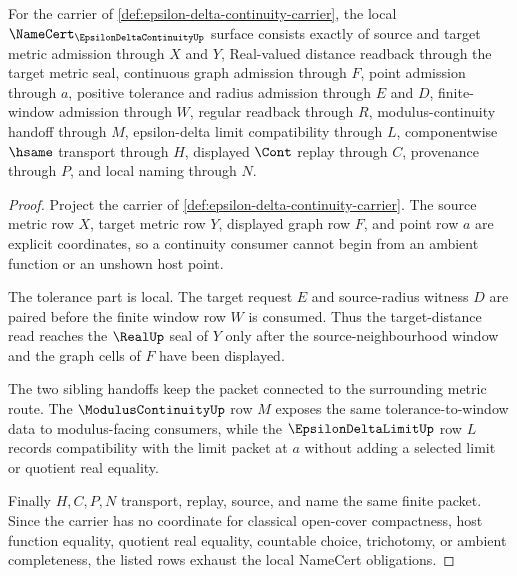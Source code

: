 \begin{theorem}
\label{thm:epsilon-delta-continuity-namecert-obligations}
For the carrier of \autoref{def:epsilon-delta-continuity-carrier}, the local $\NameCert_{\EpsilonDeltaContinuityUp}$ surface consists exactly of source and target metric admission through $X$ and $Y$, Real-valued distance readback through the target metric seal, continuous graph admission through $F$, point admission through $a$, positive tolerance and radius admission through $E$ and $D$, finite-window admission through $W$, regular readback through $R$, modulus-continuity handoff through $M$, epsilon-delta limit compatibility through $L$, componentwise $\hsame$ transport through $H$, displayed $\Cont$ replay through $C$, provenance through $P$, and local naming through $N$.
\end{theorem}
\begin{proof}
Project the carrier of \autoref{def:epsilon-delta-continuity-carrier}. The source metric row $X$, target metric row $Y$, displayed graph row $F$, and point row $a$ are explicit coordinates, so a continuity consumer cannot begin from an ambient function or an unshown host point.

The tolerance part is local. The target request $E$ and source-radius witness $D$ are paired before the finite window row $W$ is consumed. Thus the target-distance read reaches the $\RealUp$ seal of $Y$ only after the source-neighbourhood window and the graph cells of $F$ have been displayed.

The two sibling handoffs keep the packet connected to the surrounding metric route. The $\ModulusContinuityUp$ row $M$ exposes the same tolerance-to-window data to modulus-facing consumers, while the $\EpsilonDeltaLimitUp$ row $L$ records compatibility with the limit packet at $a$ without adding a selected limit or quotient real equality.

Finally $H,C,P,N$ transport, replay, source, and name the same finite packet. Since the carrier has no coordinate for classical open-cover compactness, host function equality, quotient real equality, countable choice, trichotomy, or ambient completeness, the listed rows exhaust the local NameCert obligations.
\end{proof}

